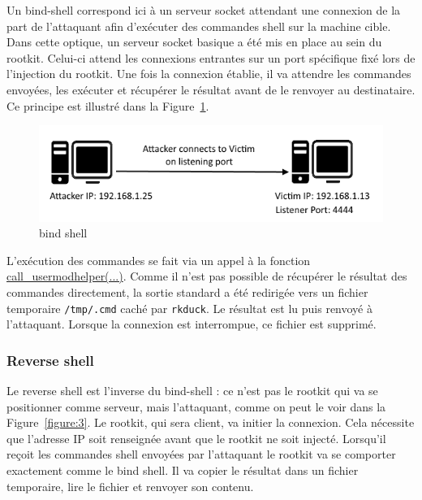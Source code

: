 \documentclass[12pt]{article}
\begin{document}
            Un bind-shell correspond ici à un serveur socket attendant une connexion de la part de l'attaquant afin d'exécuter des commandes shell sur la machine cible. Dans cette optique, un serveur socket basique a été mis en place au sein du rootkit. Celui-ci attend les connexions entrantes sur un port spécifique fixé lors de l'injection du rootkit. Une fois la connexion établie, il va attendre les commandes envoyées, les exécuter et récupérer le résultat avant de le renvoyer au destinataire. Ce principe est illustré dans la Figure~\ref{figure:2}.
            
\begin{figure}[H] 
\begin{center}
\includegraphics{./img/bind-shell.png}

\caption[dsfsdf]{bind shell}\label{figure:2}
\end{center}
\end{figure}
            
            L'exécution des commandes se fait via un appel à la fonction \href{https://www.kernel.org/doc/htmldocs/kernel-api/API-call-usermodehelper.html}{ call\_usermodhelper(...)}. Comme il n'est pas possible de récupérer le résultat des commandes directement, la sortie standard a été redirigée vers un fichier temporaire \texttt{/tmp/.cmd} caché par \texttt{rkduck}. Le résultat est lu puis renvoyé à l'attaquant. Lorsque la connexion est interrompue, ce fichier est supprimé.
            
        \subsubsection{Reverse shell}
            
            Le reverse shell est l'inverse du bind-shell : ce n'est pas le rootkit qui va se positionner comme serveur, mais l'attaquant, comme on peut le voir dans la Figure~\ref{figure:3}. Le rootkit, qui sera client, va initier la connexion. Cela nécessite que l'adresse IP soit renseignée avant que le rootkit ne soit injecté. Lorsqu'il reçoit les commandes shell envoyées par l'attaquant le rootkit va se comporter exactement comme le bind shell. Il va copier le résultat dans un fichier temporaire, lire le fichier et renvoyer son contenu.
            
\end{document}
